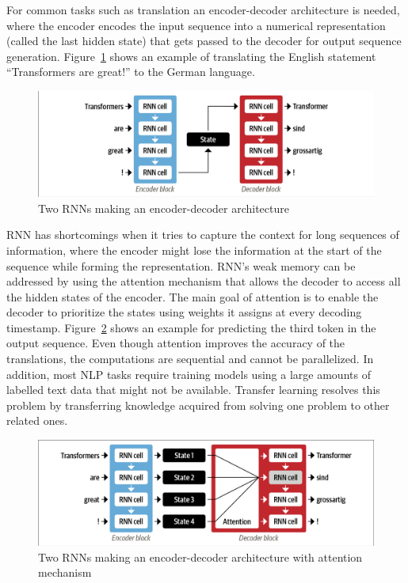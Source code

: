 For common tasks such as translation an encoder-decoder architecture is needed, where the encoder encodes the
input sequence into a numerical representation (called the last hidden state) that gets passed to
the decoder for output sequence generation. Figure~\ref{fig:rnn_encoder_decoder} shows an example of translating the
English statement ``Transformers are great!'' to the German language. 

\begin{figure}[H]
\begin{center}
  \includegraphics[width=12cm, trim={0.1cm 0.1cm 0.1cm 0.1cm},clip]{./images/encoder-decoder_rnn.png}
\end{center}
\caption{Two \ac{RNN}s making an encoder-decoder architecture \cite{tunstallNaturalLanguageProcessing2022}}
\label{fig:rnn_encoder_decoder}
\end{figure}

\ac{RNN} has shortcomings when it tries to capture the context for long sequences of information, where the encoder might lose the information at the start of the sequence while forming the representation. \ac{RNN}'s  weak memory can be
addressed by using the attention mechanism that allows the decoder to access all the hidden states
of the encoder. The main goal of attention is to enable the decoder to prioritize the states using
weights it assigns at every decoding timestamp. Figure~\ref{fig:rnn_encoder_decoder_attention} shows
an example for predicting the third token in the output sequence. Even though attention improves the
accuracy of the translations, the computations are sequential and cannot be parallelized. In
addition, most \ac{NLP} tasks require training models using a large amounts of labelled text data that
might not be available. Transfer learning resolves this problem by transferring knowledge acquired
from solving one problem to other related ones.

\begin{figure}[H]
\begin{center}
  \includegraphics[width=12cm,trim={0.1cm 0.1cm 0.1cm 0.1cm},clip]{./images/encoder-decoder_rnn_attention.png}
\end{center}
\caption{Two \ac{RNN}s making an encoder-decoder architecture with attention mechanism \cite{tunstallNaturalLanguageProcessing2022}}
\label{fig:rnn_encoder_decoder_attention}
\end{figure}

